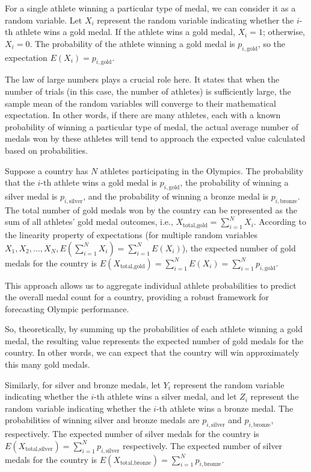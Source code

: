 \documentclass[12pt]{article}
\begin{document}
For a single athlete winning a particular type of medal, we can consider it as a random variable. Let $X_i$ represent the random variable indicating whether the $i$-th athlete wins a gold medal. If the athlete wins a gold medal, $X_i = 1$; otherwise, $X_i = 0$. The probability of the athlete winning a gold medal is $p_{i,\text{gold}}$, so the expectation $E(X_i) = p_{i, \text{gold}}$.

The law of large numbers plays a crucial role here. It states that when the number of trials (in this case, the number of athletes) is sufficiently large, the sample mean of the random variables will converge to their mathematical expectation. In other words, if there are many athletes, each with a known probability of winning a particular type of medal, the actual average number of medals won by these athletes will tend to approach the expected value calculated based on probabilities.

Suppose a country has $N$ athletes participating in the Olympics. The probability that the $i$-th athlete wins a gold medal is $p_{i,\text{gold}}$, the probability of winning a silver medal is $p_{i,\text{silver}}$, and the probability of winning a bronze medal is $p_{i,\text{bronze}}$. The total number of gold medals won by the country can be represented as the sum of all athletes' gold medal outcomes, i.e., $X_{\text{total,gold}} = \sum^N_{i=1}X_i$. According to the linearity property of expectations (for multiple random variables $X_1,X_2,\ldots,X_N,E(\sum^N_{i=1}X_i) = \sum^N_{i=1}E(X_i)$), the expected number of gold medals for the country is $E(X_{\text{total,gold}}) = \sum^N_{i=1}E(X_i) = \sum^N_{i=1}p_{i, \text{gold}}$.

This approach allows us to aggregate individual athlete probabilities to predict the overall medal count for a country, providing a robust framework for forecasting Olympic performance.

So, theoretically, by summing up the probabilities of each athlete winning a gold medal, the resulting value represents the expected number of gold medals for the country. In other words, we can expect that the country will win approximately this many gold medals.

Similarly, for silver and bronze medals, let $Y_i$ represent the random variable indicating whether the $i$-th athlete wins a silver medal, and let $Z_i$ represent the random variable indicating whether the $i$-th athlete wins a bronze medal. The probabilities of winning silver and bronze medals are $p_{i,\text{silver}}$ and $p_{i,\text{bronze}}$, respectively. The expected number of silver medals for the country is $E(X_{\text{total,silver}}) = \sum^N_{i=1}p_{i,\text{silver}}$ respectively. The expected number of silver medals for the country is $E(X_{\text{total,bronze}}) = \sum^N_{i=1}p_{i,\text{bronze}}$.
\end{document}
